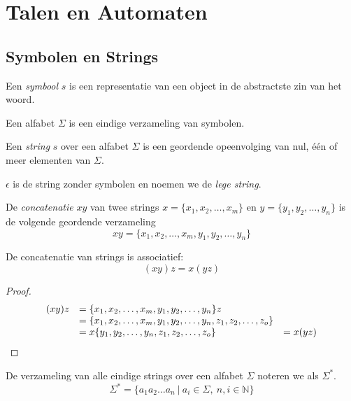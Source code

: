 \documentclass[main.tex]{subfiles}
\begin{document}
\chapter{Talen en Automaten}
\label{cha:talen-en-automaten}


\section{Symbolen en Strings}
\label{sec:symbolen-en-strings}

\begin{de}
  Een \emph{symbool} $s$ is een representatie van een object in de abstractste zin van het woord. 
\end{de}

\begin{de}
  Een alfabet $\Sigma$ is een eindige verzameling van symbolen.
\end{de}

\begin{de}
  Een \emph{string} $s$ over een alfabet $\Sigma$ is een geordende opeenvolging van nul, \'e\'en of   meer elementen van $\Sigma$.
\end{de}

\begin{de}
  $\epsilon$ is de string zonder symbolen en noemen we de \emph{lege string}.
\end{de}

\begin{de}
  De \emph{concatenatie} $xy$ van twee strings $x = \{x_1,x_2,\ldots,x_m\}$ en $y =   \{y_1,y_2,\ldots,y_n\}$ is de volgende geordende verzameling  
  \[
  xy = \{ x_1,x_2,\ldots,x_m,y_1,y_2,\ldots,y_n\}
  \] 
\end{de}

\begin{ei}
  De concatenatie van strings is associatief:
  \[
  (xy)z = x(yz)
  \]
  \begin{proof}
    \[
    \begin{array}{r l l}
      (xy)z &= \{x_1,x_2,\ldots,x_m,y_1,y_2,\ldots,y_n\}z &\\
            &= \{x_1,x_2,\ldots,x_m,y_1,y_2,\ldots,y_n,z_1,z_2,\ldots,z_o\} &\\
            &= x\{y_1,y_2,\ldots,y_n,z_1,z_2,\ldots,z_o\} &= x(yz)
    \end{array}
    \]
  \end{proof}
\end{ei}

\begin{de} 
  De verzameling van alle eindige strings over een alfabet $\Sigma$ noteren we als $\Sigma^{*}$.
  \[ \Sigma^{*} = \{ a_{1}a_{2}\ldots a_{n}\ |\ a_{i}\in \Sigma,\ n,i\in \mathbb{N} \} \]
\end{de}
\end{document}
